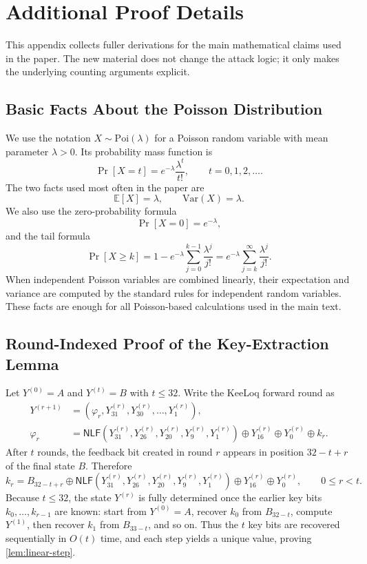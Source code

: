\documentclass[version=preprint]{iacrcc}
\providecommand{\NLF}{\mathsf{NLF}}
\begin{document}
\section{Additional Proof Details}\label{app:proofs}

This appendix collects fuller derivations for the main mathematical claims used in the paper.
The new material does not change the attack logic; it only makes the underlying counting arguments explicit.

\subsection{Basic Facts About the Poisson Distribution}\label{app:poisson-basics}

We use the notation $X \sim \mathrm{Poi}(\lambda)$ for a Poisson random variable with mean parameter $\lambda > 0$.
Its probability mass function is
\[
\Pr[X=t] = e^{-\lambda}\frac{\lambda^t}{t!},
\qquad t=0,1,2,\dots.
\]
The two facts used most often in the paper are
\[
\mathbb{E}[X]=\lambda,
\qquad
\mathrm{Var}(X)=\lambda.
\]
We also use the zero-probability formula
\[
\Pr[X=0]=e^{-\lambda},
\]
and the tail formula
\[
\Pr[X\ge k] = 1 - e^{-\lambda}\sum_{j=0}^{k-1}\frac{\lambda^j}{j!}
= e^{-\lambda}\sum_{j=k}^{\infty}\frac{\lambda^j}{j!}.
\]
When independent Poisson variables are combined linearly, their expectation and variance are computed by the standard rules for independent random variables.
These facts are enough for all Poisson-based calculations used in the main text.

\subsection{Round-Indexed Proof of the Key-Extraction Lemma}\label{app:proof-linear-step}

Let $Y^{(0)}=A$ and $Y^{(t)}=B$ with $t \leq 32$.
Write the KeeLoq forward round as
\[
\begin{aligned}
Y^{(r+1)} &= (\varphi_r, Y^{(r)}_{31}, Y^{(r)}_{30}, \dots, Y^{(r)}_{1}), \\
\varphi_r &= \NLF(Y^{(r)}_{31},Y^{(r)}_{26},Y^{(r)}_{20},Y^{(r)}_{9},Y^{(r)}_{1}) \oplus Y^{(r)}_{16} \oplus Y^{(r)}_{0} \oplus k_r.
\end{aligned}
\]
After $t$ rounds, the feedback bit created in round $r$ appears in position $32-t+r$ of the final state $B$.
Therefore
\[
k_r = B_{32-t+r}
\oplus \NLF(Y^{(r)}_{31},Y^{(r)}_{26},Y^{(r)}_{20},Y^{(r)}_{9},Y^{(r)}_{1})
\oplus Y^{(r)}_{16} \oplus Y^{(r)}_{0},
\qquad 0 \le r < t.
\]
Because $t \le 32$, the state $Y^{(r)}$ is fully determined once the earlier key bits $k_0,\dots,k_{r-1}$ are known: start from $Y^{(0)}=A$, recover $k_0$ from $B_{32-t}$, compute $Y^{(1)}$, then recover $k_1$ from $B_{33-t}$, and so on.
Thus the $t$ key bits are recovered sequentially in $O(t)$ time, and each step yields a unique value, proving \autoref{lem:linear-step}.
\end{document}
